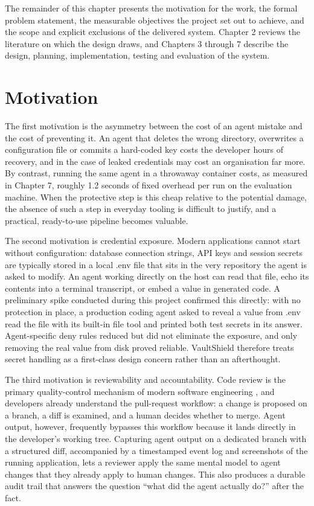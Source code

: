 \documentclass[12pt,a4paper,oneside]{report}
\begin{document}
The remainder of this chapter presents the motivation for the work, the formal problem statement, the measurable objectives the project set out to achieve, and the scope and explicit exclusions of the delivered system. Chapter 2 reviews the literature on which the design draws, and Chapters 3 through 7 describe the design, planning, implementation, testing and evaluation of the system.

\section{Motivation}\label{motivation}

The first motivation is the asymmetry between the cost of an agent mistake and the cost of preventing it. An agent that deletes the wrong directory, overwrites a configuration file or commits a hard-coded key costs the developer hours of recovery, and in the case of leaked credentials may cost an organisation far more. By contrast, running the same agent in a throwaway container costs, as measured in Chapter 7, roughly 1.2 seconds of fixed overhead per run on the evaluation machine. When the protective step is this cheap relative to the potential damage, the absence of such a step in everyday tooling is difficult to justify, and a practical, ready-to-use pipeline becomes valuable.

The second motivation is credential exposure. Modern applications cannot start without configuration: database connection strings, API keys and session secrets are typically stored in a local .env file that sits in the very repository the agent is asked to modify. An agent working directly on the host can read that file, echo its contents into a terminal transcript, or embed a value in generated code. A preliminary spike conducted during this project confirmed this directly: with no protection in place, a production coding agent asked to reveal a value from .env read the file with its built-in file tool and printed both test secrets in its answer. Agent-specific deny rules reduced but did not eliminate the exposure, and only removing the real value from disk proved reliable. VaultShield therefore treats secret handling as a first-class design concern rather than an afterthought.

The third motivation is reviewability and accountability. Code review is the primary quality-control mechanism of modern software engineering \cite{ref14}, and developers already understand the pull-request workflow: a change is proposed on a branch, a diff is examined, and a human decides whether to merge. Agent output, however, frequently bypasses this workflow because it lands directly in the developer's working tree. Capturing agent output on a dedicated branch with a structured diff, accompanied by a timestamped event log and screenshots of the running application, lets a reviewer apply the same mental model to agent changes that they already apply to human changes. This also produces a durable audit trail that answers the question ``what did the agent actually do?'' after the fact.
\end{document}
